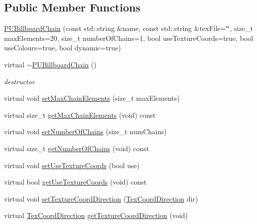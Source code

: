 \subsection*{Public Member Functions}
\begin{DoxyCompactItemize}
\item 
\hyperlink{classPUBillboardChain_a15030a1f3d4f5a1a854a2c5646f21690}{P\+U\+Billboard\+Chain} (const std\+::string \&name, const std\+::string \&tex\+File=\char`\"{}\char`\"{}, size\+\_\+t max\+Elements=20, size\+\_\+t number\+Of\+Chains=1, bool use\+Texture\+Coords=true, bool use\+Colours=true, bool dynamic=true)
\item 
\mbox{\label{classPUBillboardChain_a40bd94046b56f9a31a4de5ee48152de4}} 
virtual \hyperlink{classPUBillboardChain_a40bd94046b56f9a31a4de5ee48152de4}{$\sim$\+P\+U\+Billboard\+Chain} ()
\begin{DoxyCompactList}\small\item\em destructor \end{DoxyCompactList}\item 
virtual void \hyperlink{classPUBillboardChain_aa58e00d60390334e66dd7742f708ee76}{set\+Max\+Chain\+Elements} (size\+\_\+t max\+Elements)
\item 
virtual size\+\_\+t \hyperlink{classPUBillboardChain_af8944accdd3c6500700e4508feb703e9}{get\+Max\+Chain\+Elements} (void) const
\item 
virtual void \hyperlink{classPUBillboardChain_afb09bb4c28a0475beb2c6575c7eeffa5}{set\+Number\+Of\+Chains} (size\+\_\+t num\+Chains)
\item 
virtual size\+\_\+t \hyperlink{classPUBillboardChain_acd50f9bc6f78acb7138e85f0b0cf1f0f}{get\+Number\+Of\+Chains} (void) const
\item 
virtual void \hyperlink{classPUBillboardChain_a8afb13bc06161cc45d639d90704019ca}{set\+Use\+Texture\+Coords} (bool use)
\item 
virtual bool \hyperlink{classPUBillboardChain_a1dbfd007093aa2f03f3f0a3f114a7711}{get\+Use\+Texture\+Coords} (void) const
\item 
virtual void \hyperlink{classPUBillboardChain_a9d2db6325df125ca6bfad0e1277668dc}{set\+Texture\+Coord\+Direction} (\hyperlink{classPUBillboardChain_a6ebaec09a615199356b9d50fdab2209f}{Tex\+Coord\+Direction} dir)
\item 
virtual \hyperlink{classPUBillboardChain_a6ebaec09a615199356b9d50fdab2209f}{Tex\+Coord\+Direction} \hyperlink{classPUBillboardChain_ae122ca85af280539d493f39ea656a0b4}{get\+Texture\+Coord\+Direction} (void)

\end{DoxyCompactItemize}
